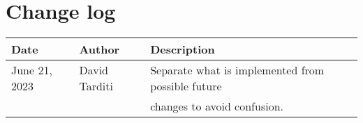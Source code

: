 \chapter*{Change log}

\begin{table}
    \begin{tabular}{|l|l|l|}
    \hline
    Date & Author & Description \\
    \hline
    June 21, 2023 & David Tarditi & Separate what is implemented from possible future \\
                  &               & changes to avoid confusion. \\
    \hline
    \end{tabular}
\end{table}

\pagebreak